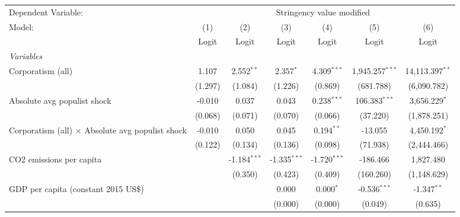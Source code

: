
\begingroup
\centering
\begin{tabular}{lcccccc}
   \toprule
   Dependent Variable: & \multicolumn{6}{c}{Stringency value modified}\\
   Model:                                                  & (1)     & (2)            & (3)            & (4)            & (5)                & (6)\\  
                                                           &  Logit  & Logit          & Logit          & Logit          & Logit              & Logit\\  
   \midrule
   \emph{Variables}\\
   Corporatism (all)                                       & 1.107   & 2.552$^{**}$   & 2.357$^{*}$    & 4.309$^{***}$  & 1,945.257$^{***}$  & 14,113.397$^{**}$\\   
                                                           & (1.297) & (1.084)        & (1.226)        & (0.869)        & (681.788)          & (6,090.782)\\   
   Absolute avg populist shock                             & -0.010  & 0.037          & 0.043          & 0.238$^{***}$  & 106.383$^{***}$    & 3,656.229$^{*}$\\   
                                                           & (0.068) & (0.071)        & (0.070)        & (0.066)        & (37.220)           & (1,878.251)\\   
   Corporatism (all) $\times$ Absolute avg populist shock  & -0.010  & 0.050          & 0.045          & 0.194$^{**}$   & -13.055            & 4,450.192$^{*}$\\   
                                                           & (0.122) & (0.134)        & (0.136)        & (0.098)        & (71.938)           & (2,444.466)\\   
   CO2 emissions per capita                                &         & -1.184$^{***}$ & -1.335$^{***}$ & -1.720$^{***}$ & -186.466           & 1,827.480\\   
                                                           &         & (0.350)        & (0.423)        & (0.409)        & (160.260)          & (1,148.629)\\   
   GDP per capita (constant 2015 US\$)                     &         &                & 0.000          & 0.000$^{*}$    & -0.536$^{***}$     & -1.347$^{**}$\\   
                                                           &         &                & (0.000)        & (0.000)        & (0.049)            & (0.635)\\   

\end{tabular}
